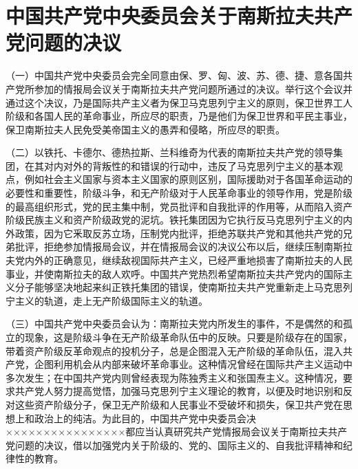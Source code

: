 \section[中国共产党中央委员会关于南斯拉夫共产党问题的决议（一九四八年七月十日）]{中国共产党中央委员会关于南斯拉夫共产党问题的决议}


（一）中国共产党中央委员会完全同意由保、罗、匈、波、苏、德、捷、意各国共产党所参加的情报局会议关于南斯拉夫共产党问题所通过的决议。举行这个会议并通过这个决议，乃是国际共产主义者为保卫马克思列宁主义的原则，保卫世界工人阶级和各国人民的革命事业，所应尽的职责，乃是他们为保卫世界和平民主事业，保卫南斯拉夫人民免受美帝国主义的愚弄和侵略，所应尽的职责。

（二）以铁托、卡德尔、德热拉斯、兰科维奇为代表的南斯拉夫共产党的领导集团，在其对内对外的背叛性的和错误的行动中，违反了马克思列宁主义的基本观点，例如社会主义国家与资本主义国家的原则区别，国际援助对于各国革命运动的必要性和重要性，阶级斗争，和无产阶级对于人民革命事业的领导作用，党是阶级的最高组织形式，党的民主集中制，党员批评和自我批评的作用等，从而陷入资产阶级民族主义和资产阶级政党的泥坑。铁托集团因为它执行反马克思列宁主义的内外政策，因为它釆取反苏立场，压制党内批评，拒绝苏联共产党和其他共产党的兄弟批评，拒绝参加情报局会议，并在情报局会议的决议公布以后，继续压制南斯拉夫党内外的正确意见，继续敌视国际共产主义，已经严重地损害了南斯拉夫的人民事业，并使南斯拉夫的敌人欢呼。中国共产党热烈希望南斯拉夫共产党内的国际主义分子能够坚决地起来纠正铁托集团的错误，使南斯拉夫共产党重新走上马克思列宁主义的轨道，走上无产阶级国际主义的轨道。

（三）中国共产党中央委员会认为：南斯拉夫党内所发生的事件，不是偶然的和孤立的现象，这是阶级斗争在无产阶级革命队伍中的反映。只要是阶级存在的国家，带着资产阶级反革命观点的投机分子，总是企图混入无产阶级的革命队伍，混入共产党，企图利用机会从内部来破坏革命事业。这种情况曾经在国际共产主义运动中多次发生；在中国共产党内则曾经表现为陈独秀主义和张国焘主义。这种情况，要求共产党人努力提高觉悟，加强马克思列宁主义理论的教育，以便及时地识别和反对这些资产阶级分子，保卫无产阶级和人民事业不受破坏和损失，保卫共产党在思想上和政治上的纯洁。为此目的，中国共产党中央委员会决××××××××××××××××都应当认真研究共产党情报局会议关于南斯拉夫共产党问题的决议，借以加强党内关于阶级的、党的、国际主义的、自我批评精神和纪律性的教育。

